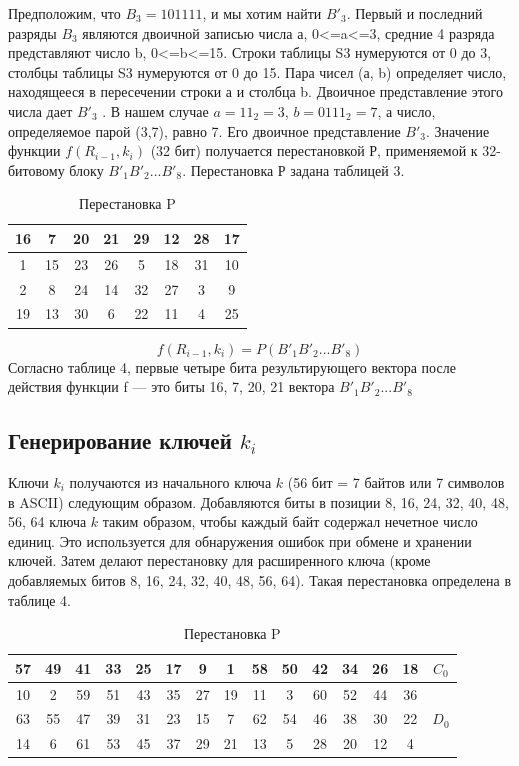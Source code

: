 Предположим, что $B_3 = 101111$, и мы хотим найти $B'_3$. Первый и последний разряды $B_{3}$ являются двоичной записью числа а, 0<=a<=3, средние 4 разряда представляют число b, 0<=b<=15. Строки таблицы S3 нумеруются от 0 до 3, столбцы таблицы S3 нумеруются от 0 до 15. Пара чисел (а, b) определяет число, находящееся в пересечении строки а и столбца b. Двоичное представление этого числа дает $B'_3$ . В нашем случае $a=11_{2}=3$, $b=0111_{2}=7$, а число, определяемое парой (3,7), равно 7. Его двоичное представление $B'_{3}$. Значение функции $f(R_{i-1},k_{i})$ (32 бит) получается перестановкой Р, применяемой к 32-битовому блоку $B'_{1}B'_{2}...B'_{8}$. Перестановка Р задана таблицей 3.

\begin{table}[H]
    \caption{Перестановка P}
	\begin{tabular}{|c|c|c|c|c|c|c|c|}
    \hline
    16	& 7	& 20	& 21	& 29	& 12	& 28	& 17\\
    \hline
    1	& 15	& 23	& 26	& 5	& 18	& 31	& 10\\
    \hline
    2	& 8	& 24	& 14	& 32	& 27	& 3	& 9\\
    \hline
    19	& 13	& 30	& 6	& 22	& 11	& 4	& 25\\
    \hline
	\end{tabular}
\end{table}

\[f(R_{i-1},k_i) = P(B'_1B'_2...B'_8)\]
Согласно таблице 4, первые четыре бита результирующего вектора после действия функции f — это биты 16, 7, 20, 21 вектора $B'_{1}B'_{2}...B'_{8}$

\subsection{Генерирование ключей $k_i$}

Ключи $k_i$ получаются из начального ключа $k$ (56 бит = 7 байтов или 7 символов в ASCII) следующим образом. Добавляются биты в позиции 8, 16, 24, 32, 40, 48, 56, 64 ключа $k$ таким образом, чтобы каждый байт содержал нечетное число единиц. Это используется для обнаружения ошибок при обмене и хранении ключей. Затем делают перестановку для расширенного ключа (кроме добавляемых битов 8, 16, 24, 32, 40, 48, 56, 64). Такая перестановка определена в таблице 4.
\begin{table}[H]
    \caption{Перестановка P}
	\begin{tabular}{|c|c|c|c|c|c|c|c|c|c|c|c|c|c|c|}
    \hline
    57	& 49	& 41	& 33	& 25	& 17	& 9	& 1	& 58	& 50	& 42	& 34	& 26	& 18 &	$C_{0}$\\
    \hline
    10	& 2	& 59	& 51	& 43	& 35	& 27	& 19	& 11	& 3	& 60	& 52	& 44	& 36 &\\
    \hline
    63	& 55	& 47	& 39	& 31	& 23	& 15	& 7	& 62 &	54	& 46	& 38	& 30	& 22 & $D_0$\\
    \hline
    14	& 6	& 61	& 53	& 45	& 37	& 29	& 21	& 13	& 5	& 28	& 20	& 12	& 4&\\
    \hline
    \end{tabular}
\end{table}

